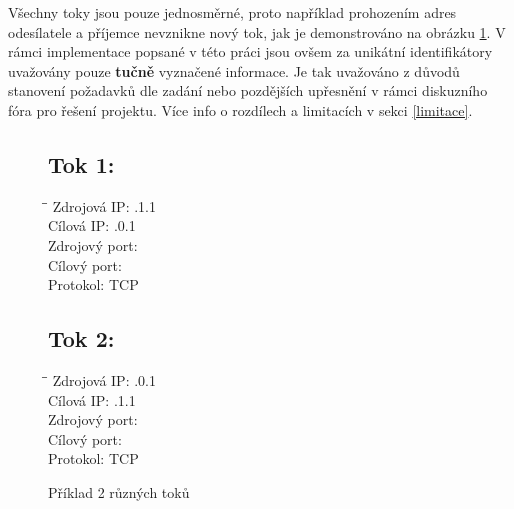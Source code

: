 \documentclass[11pt, a4paper, hidelinks]{article}[08.10.2023]
\begin{document}
    Všechny toky jsou pouze jednosměrné, proto například prohozením adres odesílatele a příjemce nevznikne
    nový tok, jak je demonstrováno na obrázku \ref{priklad1}. V rámci implementace popsané v této práci jsou ovšem za unikátní identifikátory uvažovány
    pouze \textbf{tučně} vyznačené informace. Je tak uvažováno z důvodů stanovení požadavků dle zadání nebo pozdějších upřesnění v rámci diskuzního fóra pro řešení projektu. Více info o rozdílech a limitacích v sekci \ref{limitace}.
    \vspace{2cm}

    \begin{figure}[H]
        \begin{minipage}[t]{0.45\textwidth}
            \subsection*{Tok 1:}
            \begin{tabbing}
                \hspace*{4cm}\=\hspace*{4cm}\= \kill
                Zdrojová IP: .1.1 \\
                Cílová IP: .0.1 \\
                Zdrojový port:  \\
                Cílový port:  \\
                Protokol: \> TCP \\
            \end{tabbing}
        \end{minipage}
            \hfill
        \begin{minipage}[t]{0.45\textwidth}
            \subsection*{Tok 2:}
            \begin{tabbing}
                \hspace*{4cm}\=\hspace*{4cm}\= \kill
                Zdrojová IP: .0.1 \\
                Cílová IP: .1.1 \\
                Zdrojový port:  \\
                Cílový port:  \\
                Protokol: \> TCP \\
            \end{tabbing}
        \end{minipage}
        \caption{Příklad 2 různých toků}
        \label{priklad1}
    \end{figure}
\end{document}
